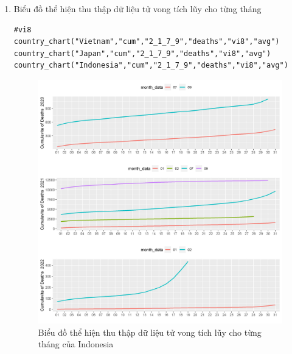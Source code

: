 \documentclass[a4paper]{article}
\theoremstyle{definition}
\begin{document}
\begin{enumerate}[i)]
\begin{enumerate}[1)]
    \item Biểu đồ thể hiện thu thập dữ liệu tử vong tích lũy cho từng tháng
\begin{lstlisting}[frame=single]  
#vi8
country_chart("Vietnam","cum","2_1_7_9","deaths","vi8","avg")
country_chart("Japan","cum","2_1_7_9","deaths","vi8","avg")
country_chart("Indonesia","cum","2_1_7_9","deaths","vi8","avg")
		\end{lstlisting}	
		\begin{figure}[htp]
		    \centering
		    \includegraphics[scale = 0.7]{Images/VI/vi8 Indonesia .jpeg}
		    \caption{Biểu đồ thể hiện thu thập dữ liệu tử vong tích lũy cho từng tháng của Indonesia}
		    \label{fig:my_label}
		\end{figure}
		\begin{figure}[htp]
		    \centering

\end{figure}
\end{enumerate}
\end{enumerate}
\end{document}
